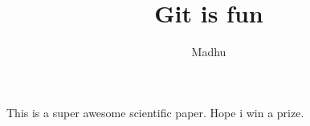 \documentclass[10pt]{article}
\author{Madhu}
\title{Git is fun}
\begin{document}
	\maketitle
	
	This is a super awesome scientific paper.
	Hope i win a prize.
\end{document}
